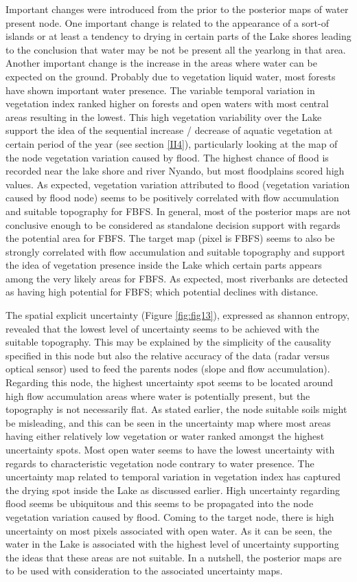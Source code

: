 \documentclass[12pt,oneside]{article}
\begin{document}
Important changes were introduced from the prior to the posterior maps of water present node. One important change is related to the appearance of a sort-of islands or at least a tendency to drying in certain parts of the Lake shores leading to the conclusion that water may be not be present all the yearlong in that area. Another important change is the increase in the areas where water can be expected on the ground. Probably due to vegetation liquid water, most forests have shown important water presence. The variable temporal variation in vegetation index ranked higher on forests and open waters with most central areas resulting in the lowest. This high vegetation variability over the Lake support the idea of the sequential increase / decrease of aquatic vegetation at certain period of the year (see section \ref{II4}), particularly looking at the map of the node vegetation variation caused by flood. The highest chance of flood is recorded near the lake shore and river Nyando, but most floodplains scored high values. As expected, vegetation variation attributed to flood (vegetation variation caused by flood node) seems to be positively correlated with flow accumulation and suitable topography for FBFS. In general, most of the posterior maps are not conclusive enough to be considered as standalone decision support with regards the potential area for FBFS. The target map (pixel is FBFS) seems to also be strongly correlated with flow accumulation and suitable topography and support the idea of vegetation presence inside the Lake which certain parts appears among the very likely areas for FBFS. As expected, most riverbanks are detected as having high potential for FBFS; which potential declines with distance.

The spatial explicit uncertainty (Figure \ref{fig:fig13}), expressed as shannon entropy, revealed that the lowest level of uncertainty seems to be achieved with the suitable topography. This may be explained by the simplicity of the causality specified in this node but also the relative accuracy of the data (radar versus optical sensor) used to feed the parents nodes (slope and flow accumulation). Regarding this node, the highest uncertainty spot seems to be located around high flow accumulation areas where water is potentially present, but the topography is not necessarily flat. As stated earlier, the node suitable soils might be misleading, and this can be seen in the uncertainty map where most areas having either relatively low vegetation or water ranked amongst the highest uncertainty spots. Most open water seems to have the lowest uncertainty with regards to characteristic vegetation node contrary to water presence. The uncertainty map related to temporal variation in vegetation index has captured the drying spot inside the Lake as discussed earlier. High uncertainty regarding flood seems be ubiquitous and this seems to be propagated into the node vegetation variation caused by flood. Coming to the target node, there is high uncertainty on most pixels associated with open water. As it can be seen, the water in the Lake is associated with the highest level of uncertainty supporting the ideas that these areas are not suitable. In a nutshell, the posterior maps are to be used with consideration to the associated uncertainty maps.
\end{document}
